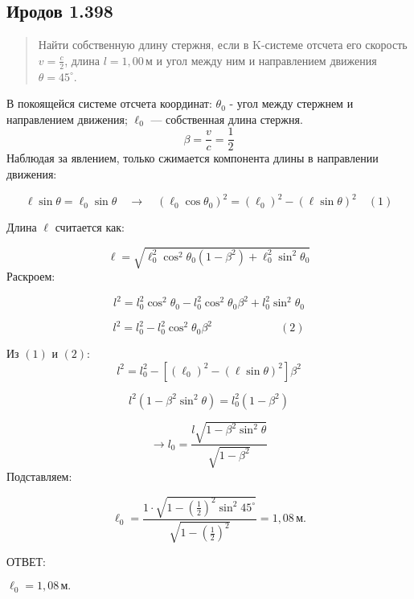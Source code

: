 \subsection*{Иродов 1.398}

\setcounter{equation}{0}
\begin{abstract}
Найти собственную длину стержня, если в K-системе отсчета его скорость \( v = \frac{c}{2} \), длина \( l = 1,00 \, \text{м} \) и угол между ним и направлением движения \( \theta = 45^\circ \).
\end{abstract}

\noindent\hrulefill

В покоящейся системе отсчета координат: \( \theta_{0}\) - угол между стержнем и направлением движения; \( \ell_0 \) — собственная длина стержня.
\[
\beta = \frac{v}{c} = \frac{1}{2}
\]
Наблюдая за явлением, только сжимается компонента длины в направлении движения:

\[
\ell \sin \theta = \ell_0 \sin \theta \quad \xrightarrow{} \quad \left( \ell_0 \cos \theta_0 \right)^2 = \left( \ell_0 \right)^2 - \left( \ell \sin \theta \right)^2   \quad (1)
\]

Длина \(\ell \) считается как:

\[
\ell = \sqrt{\ell_0^2 \cos^2 \theta_0 \left( 1 - \beta^2 \right) + \ell_0^2 \sin^2 \theta_0}
\]
Раскроем:

\[
l^2 = l_0^2 \cos^2 \theta_0  - l_0^2 \cos^2 \theta_0\beta^2 + l_0^2 \sin^2 \theta_0
\]

\[
l^2 = l_0^2  - l_0^2 \cos^2 \theta_0\beta^2 \qquad \qquad  \qquad (2)
\]

Из \((1)\) и \((2)\):
\[
l^2 = l_0^2  - [\left( \ell_0 \right)^2 - \left( \ell \sin \theta \right)^2]\beta^2
\]

\[
l^2 (1 - \beta^2 \sin^2 \theta) = l_0^2(1-\beta^2) 
\]

\[
\xrightarrow{} l_0 = \frac{l \sqrt{1 - \beta^2 \sin^2 \theta}}{\sqrt{1 - \beta^2}}
\]
Подставляем:

\[
\ell_0 = \frac{1 \cdot \sqrt{1 - \left( \frac{1}{2} \right)^2 \sin^2 45^\circ}}{\sqrt{1 - \left( \frac{1}{2} \right)^2}} = 1,08 \, \text{м}.
\]



ОТВЕТ: 

\(\ell_0 =  1,08 \, \text{м}.\)
